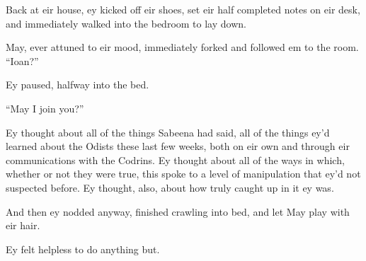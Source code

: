 Back at eir house, ey kicked off eir shoes, set eir half completed notes on eir desk, and immediately walked into the bedroom to lay down.

May, ever attuned to eir mood, immediately forked and followed em to the room. ``Ioan?''

Ey paused, halfway into the bed.

``May I join you?''

Ey thought about all of the things Sabeena had said, all of the things ey'd learned about the Odists these last few weeks, both on eir own and through eir communications with the Codrins. Ey thought about all of the ways in which, whether or not they were true, this spoke to a level of manipulation that ey'd not suspected before. Ey thought, also, about how truly caught up in it ey was.

And then ey nodded anyway, finished crawling into bed, and let May play with eir hair.

Ey felt helpless to do anything but.
